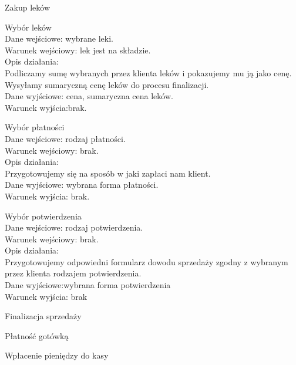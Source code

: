 \documentclass[a4paper, 11pt]{article}
\begin{document}
	\begin{myEnumerate}	
	\item  Zakup leków
	\begin{myEnumerate}
	\item  Wybór leków\\
	Dane wejściowe: wybrane leki.\\	
	Warunek wejściowy: lek jest na składzie.\\	
	Opis działania:\\
		Podliczamy sumę wybranych przez klienta leków i pokazujemy mu ją jako cenę. Wysyłamy sumaryczną cenę leków do procesu finalizacji.\\		
	Dane wyjściowe: cena, sumaryczna cena leków.\\	
	Warunek wyjścia:brak.\\	
	
	\item  Wybór płatności\\
	Dane wejściowe: rodzaj płatności.\\
	Warunek wejściowy: brak.\\
	Opis działania:\\
		Przygotowujemy się na sposób w jaki zapłaci nam klient.\\		
	Dane wyjściowe: wybrana forma płatności.\\
	Warunek wyjścia: brak.\\	
	\item Wybór potwierdzenia\\
	Dane wejściowe: rodzaj potwierdzenia.\\
	Warunek wejściowy: brak.\\
	Opis działania:\\
		Przygotowujemy odpowiedni formularz dowodu sprzedaży zgodny z wybranym przez klienta rodzajem potwierdzenia.\\		
	Dane wyjściowe:wybrana forma potwierdzenia \\
	Warunek wyjścia: brak\\	
	\item  Finalizacja sprzedaży
	\begin{myEnumerate}
	\item   Płatność gotówką
		\begin{myEnumerate}
			\item  Wpłacenie pieniędzy do kasy\\


\end{myEnumerate}
\end{myEnumerate}
\end{myEnumerate}
\end{myEnumerate}
\end{document}
